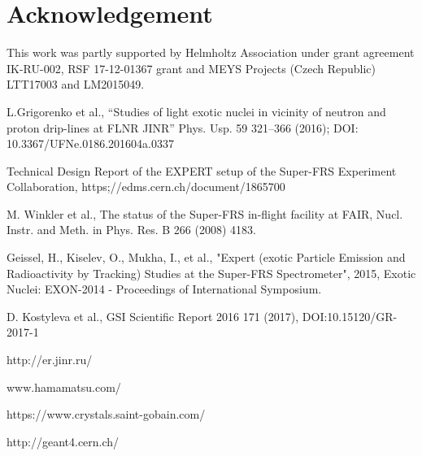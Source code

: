 \documentclass{webofc}
\newcommand{\er}{\textmd{EXPERTroot}}
\begin{document}
	
	
\section{Acknowledgement}
This  work was partly supported by Helmholtz Association under grant agreement IK-RU-002, RSF 17-12-01367 grant and MEYS Projects (Czech Republic) LTT17003 and LM2015049.

	
\begin{thebibliography}{99}
	L.Grigorenko et al., “Studies of light exotic nuclei in vicinity of neutron and proton drip-lines at FLNR JINR” Phys. Usp. 59 321–366 (2016); DOI: 10.3367/UFNe.0186.201604a.0337
	
	
	Technical Design Report of the EXPERT setup of the Super-FRS Experiment Collaboration, https;//edms.cern.ch/document/1865700
	
	M. Winkler et al., The status of the Super-FRS in-flight facility at FAIR, Nucl. Instr. and Meth. in Phys. Res. B 266 (2008) 4183.
	
	Geissel, H., Kiselev, O., Mukha, I., et al., "Expert (exotic Particle Emission and Radioactivity by Tracking) Studies at the Super-FRS Spectrometer", 2015, Exotic Nuclei: EXON-2014 - Proceedings of International Symposium.
	
	D. Kostyleva et al., GSI Scientific Report 2016 171 (2017), DOI:10.15120/GR-2017-1
	
	http://er.jinr.ru/
	
	www.hamamatsu.com/
	
	https://www.crystals.saint-gobain.com/
	
	http://geant4.cern.ch/
	
	
\end{thebibliography}
\end{document}
